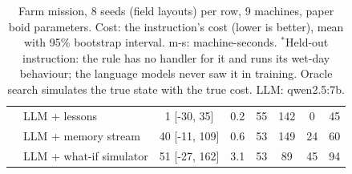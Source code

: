 \begin{table}[h!]
{\begin{tabular}{llcccccc}
 & LLM + lessons & 1 [-30, 35] & 0.2 & 55 & 142 & 0 & 45 \\
 & LLM + memory stream & 40 [-11, 109] & 0.6 & 53 & 149 & 24 & 60 \\
 & LLM + what-if simulator & 51 [-27, 162] & 3.1 & 53 & 89 & 45 & 94 \\
\hline
\end{tabular}}
\caption{Farm mission, 8 seeds (field layouts) per row, 9 machines, paper boid parameters. Cost: the instruction's cost (lower is better), mean with 95\% bootstrap interval. m-s: machine-seconds. $^*$Held-out instruction: the rule has no handler for it and runs its wet-day behaviour; the language models never saw it in training. Oracle search simulates the true state with the true cost. LLM: qwen2.5:7b.}
\label{tab:farm}
\end{table}
